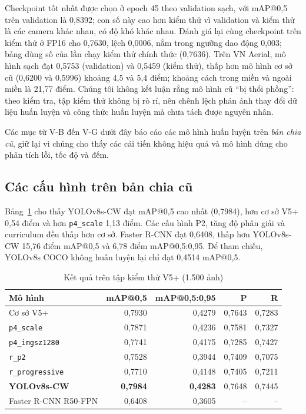 \documentclass[10pt,journal,letterpaper]{IEEEtran}
\begin{document}
Checkpoint tốt nhất được chọn ở epoch 45 theo validation sạch, với mAP@0,5 trên validation là 0,8392; con số này cao hơn kiểm thử vì validation và kiểm thử là các camera khác nhau, có độ khó khác nhau. Đánh giá lại cùng checkpoint trên kiểm thử ở FP16 cho 0,7630, lệch 0,0006, nằm trong ngưỡng dao động 0,003; bảng dùng số của lần chạy kiểm thử chính thức (0,7636). Trên VN Aerial, mô hình sạch đạt 0,5753 (validation) và 0,5459 (kiểm thử), thấp hơn mô hình cơ sở cũ (0,6200 và 0,5996) khoảng 4,5 và 5,4 điểm; khoảng cách trong miền và ngoài miền là 21,77 điểm. Chúng tôi không kết luận rằng mô hình cũ ``bị thổi phồng'': theo kiểm tra, tập kiểm thử không bị rò rỉ, nên chênh lệch phản ánh thay đổi dữ liệu huấn luyện và công thức huấn luyện mà chưa tách được nguyên nhân.

Các mục từ V-B đến V-G dưới đây báo cáo các mô hình huấn luyện trên \emph{bản chia cũ}, giữ lại vì chúng cho thấy các cải tiến không hiệu quả và mô hình dùng cho phân tích lỗi, tốc độ và đếm.

\subsection{Các cấu hình trên bản chia cũ}
Bảng~\ref{tab:main} cho thấy YOLOv8s-CW đạt mAP@0,5 cao nhất (0,7984), hơn cơ sở V5+ 0,54 điểm và hơn \texttt{p4\_scale} 1,13 điểm. Các cấu hình P2, tăng độ phân giải và curriculum đều thấp hơn cơ sở. Faster R-CNN đạt 0,6408, thấp hơn YOLOv8s-CW 15,76 điểm mAP@0,5 và 6,78 điểm mAP@0,5:0,95. Để tham chiếu, YOLOv8s COCO không huấn luyện lại chỉ đạt 0,4514 mAP@0,5.

\begin{table}[!t]
\caption{Kết quả trên tập kiểm thử V5+ (1.500 ảnh)}
\label{tab:main}
\centering
\footnotesize
\begin{tabular}{lrrrr}
\toprule
Mô hình & mAP@0,5 & mAP@0,5:0,95 & P & R \\
\midrule
Cơ sở V5+ & 0,7930 & 0,4279 & 0,7643 & 0,7283 \\
\texttt{p4\_scale} & 0,7871 & 0,4236 & 0,7581 & 0,7327 \\
\texttt{p4\_imgsz1280} & 0,7741 & 0,4175 & 0,7285 & 0,7427 \\
\texttt{r\_p2} & 0,7528 & 0,3944 & 0,7409 & 0,7075 \\
\texttt{r\_progressive} & 0,7710 & 0,4148 & 0,7405 & 0,7211 \\
\textbf{YOLOv8s-CW} & \textbf{0,7984} & \textbf{0,4283} & 0,7648 & 0,7445 \\
\midrule
Faster R-CNN R50-FPN & 0,6408 & 0,3605 & -- & -- \\
\bottomrule
\end{tabular}
\end{table}
\end{document}

